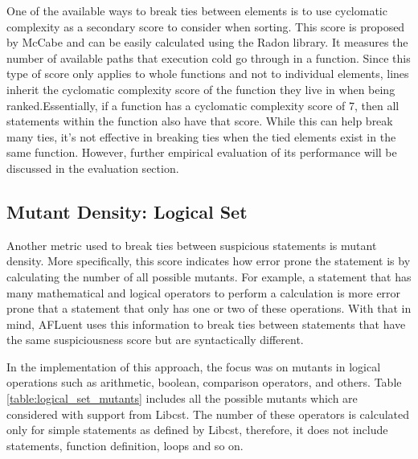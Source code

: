 One of the available ways to break ties between elements is to use cyclomatic
complexity as a secondary score to consider when sorting. This score is proposed
by McCabe \cite{cyclomatic_complexity} and can be easily calculated using the Radon library. It measures the number of available paths that execution
cold go through in a function. Since this type of score only applies to whole
functions and not to individual elements, lines inherit the cyclomatic
complexity score of the function they live in when being ranked.Essentially, if
a function has a cyclomatic complexity score of 7, then all statements within
the function also have that score. While this can help break many ties, it's not
effective in breaking ties when the tied elements exist in the same function.
However, further empirical evaluation of its performance will be discussed in
the evaluation section.

\subsection{Mutant Density: Logical Set}
\label{subsec:tiebreak_mutant_density_logical}

Another metric used to break ties between suspicious statements is mutant
density. More specifically, this score indicates how error prone the statement
is by calculating the number of all possible mutants. For example, a statement
that has many mathematical and logical operators to perform a calculation is
more error prone that a statement that only has one or two of these operations.
With that in mind, AFLuent uses this information to break ties between
statements that have the same suspiciousness score but are syntactically
different.

In the implementation of this approach, the focus was on mutants in logical
operations such as arithmetic, boolean, comparison operators, and others.
Table \ref{table:logical_set_mutants} includes all the possible mutants which
are considered with support from Libcst. The number of these operators is
calculated only for simple statements as defined by Libcst, therefore, it does
not include  statements, function definition,  loops and so on.

